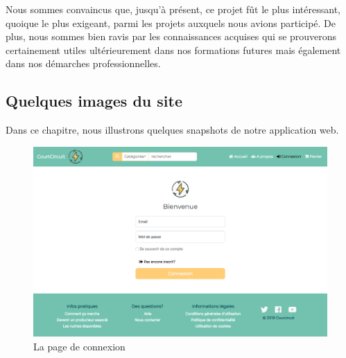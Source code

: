 \documentclass[a4paper,12pt]{report}
\theoremstyle{break}
\theoremstyle{break}
\theoremstyle{break}
\theoremstyle{break}
\theoremstyle{definition}
\theoremstyle{remark}
\begin{document}
Nous sommes convaincus que, jusqu'à présent, ce projet fût le plus intéressant, quoique le plus exigeant, parmi les projets auxquels nous avions participé. De plus, nous sommes bien ravis par les connaissances acquises qui se prouverons certainement utiles ultérieurement dans nos formations futures mais également dans nos démarches professionnelles.
\begin{appendices}
\setcounter{page}{1}

\chapter{Quelques images du site}
Dans ce chapitre, nous illustrons quelques snapshots de notre application web.

\begin{figure}[!ht]
  \centering
  \includegraphics[scale=0.35]{images/signIn.png}
  \caption{La page de connexion}
\end{figure}


\end{appendices}
\end{document}
